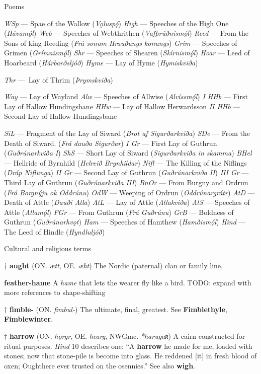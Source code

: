 Poems

\emph{WSp} — Spae of the Wallow (\emph{Vǫluspǫ́})
\emph{High} — Speeches of the High One (\emph{Hávamǫ́l})
\emph{Web} — Speeches of Webthrithen (\emph{Vafþrúðnismǫ́l})
\emph{Reed} — From the Sons of king Reeding (\emph{Frá sonum Hrauðungs konungs})
\emph{Grim} — Speeches of Grimen (\emph{Grímnismǫ́l})
\emph{Shr} — Speeches of Shearen (\emph{Skírnismǫ́l})
\emph{Hoar} — Leed of Hoarbeard (\emph{Hárbarðsljóð})
\emph{Hyme} — Lay of Hyme (\emph{Hymiskviða})

\emph{Thr} — Lay of Thrim (\emph{Þrymskviða})

\emph{Way} — Lay of Wayland
\emph{Alw} — Speeches of Allwise (\emph{Alvíssmǫ́l})
\emph{I HHb} — First Lay of Hallow Hundingsbane
\emph{HHw} — Lay of Hallow Herwardsson
\emph{II HHb} — Second Lay of Hallow Hundingsbane

\emph{SiL} — Fragment of the Lay of Siward (\emph{Brot af Sigurðarkviða})
\emph{SDe} — From the Death of Siward. (\emph{Frá dauða Sigurðar})
\emph{I Gr} — First Lay of Guthrun (\emph{Guðrúnarkviða I})
\emph{ShS} — Short Lay of Siward (\emph{Sigurðarkviða in skamma})
\emph{BHel} — Hellride of Byrnhild (\emph{Helreið Brynhildar})
\emph{Nifl} — The Killing of the Niflings (\emph{Dráp Niflunga})
\emph{II Gr} — Second Lay of Guthrun (\emph{Guðrúnarkviða II})
\emph{III Gr} — Third Lay of Guthrun (\emph{Guðrúnarkviða III})
\emph{BnOr} — From Burgny and Ordrun (\emph{Frá Borgnýju ok Oddrúnu})
\emph{OdW} — Weeping of Ordrun (\emph{Oddrúnargrátr})
\emph{AtD} — Death of Attle (\emph{Dauði Atla})
\emph{AtL} — Lay of Attle (\emph{Atlakviða})
\emph{AtS} — Speeches of Attle (\emph{Atlamǫ́l})
\emph{FGr} — From Guthrun (\emph{Frá Guðrúnu})
\emph{GrB} — Boldness of Guthrun (\emph{Guðrúnarhvǫt})
\emph{Ham} — Speeches of Hamthew (\emph{Hamðismǫ́l})
\emph{Hind} — The Leed of Hindle (\emph{Hyndluljóð})



Cultural and religious terms

† \textbf{aught} (ON. \emph{ætt}, OE. \emph{ǣht})
 The Nordic (paternal) clan or family line.

\textbf{feather-hame}
 A \emph{hame} that lets the wearer fly like a bird. TODO: expand with more references to shape-shifting

† \textbf{fimble-} (ON. \emph{fimbul-})
 The ultimate, final, greatest. See \textbf{Fimblethyle}, \textbf{Fimblewinter}.

† \textbf{harrow} (ON. \emph{hǫrgr}, OE. \emph{hearg}, NWGmc. \emph{*harugaʀ})
 A cairn constructed for ritual purposes. \emph{Hind} 10 describes one: “A \textbf{harrow} he made for me, loaded with stones; now that stone-pile is become into glass. He reddened [it] in fresh blood of oxen; Oughthere ever trusted on the osennies.” See also \textbf{wigh}.

